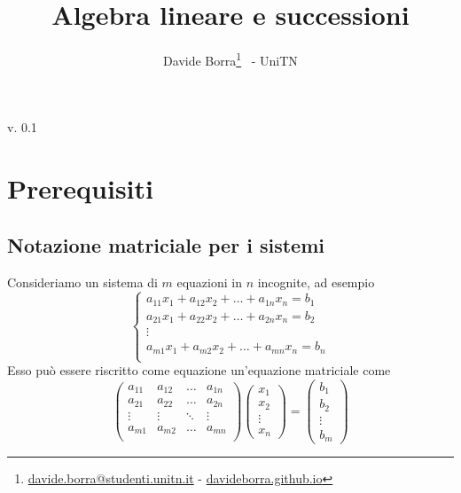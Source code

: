 \documentclass{article}     %
\title{Algebra lineare e successioni\\\textit{\small\say{Prevedere il futuro equivale a fare potenze di matrici}}}
\author{Davide Borra\footnote{\href{mailto:davide.borra@studenti.unitn.it}{davide.borra@studenti.unitn.it} - \href{http://davideborra.github.io}{davideborra.github.io}} ~- UniTN}
\begin{document}
\begin{titlepage}
    \maketitle
    \tableofcontents
    \vspace{\fill}
    \hspace{\fill} v. 0.1   %
\end{titlepage}

\chead{}

\section{Prerequisiti}
\subsection{Notazione matriciale per i sistemi}
Consideriamo un sistema di $m$ equazioni in $n$ incognite, ad esempio
\[\begin{cases} 
    a_{11}x_1 + a_{12}x_2 +\dots + a_{1n}x_n = b_1\\
    a_{21}x_1 + a_{22}x_2 +\dots + a_{2n}x_n = b_2\\
    \vdots\\
    a_{m1}x_1 + a_{m2}x_2 +\dots + a_{mn}x_n = b_n\\
 \end{cases} \]
Esso può essere riscritto come equazione un'equazione matriciale come 
\[\begin{pmatrix} 
    a_{11}& a_{12}&\dots&a_{1n}\\
    a_{21}& a_{22}&\dots&a_{2n}\\
    \vdots & \vdots & \ddots& \vdots\\
    a_{m1}& a_{m2}&\dots&a_{mn}\\
\end{pmatrix} 
\begin{pmatrix} x_1 \\ x_2 \\ \vdots \\ x_n\end{pmatrix} = \begin{pmatrix} b_1 \\ b_2 \\ \vdots \\ b_m\end{pmatrix} 
\]
\end{document}
